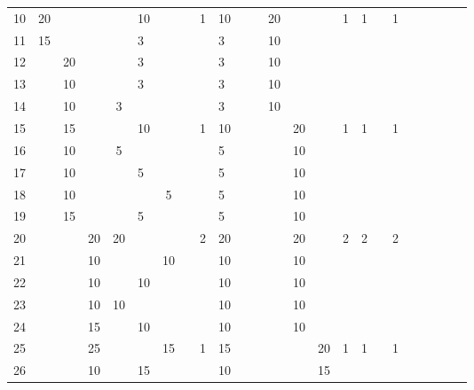 \begin{table}
\begin{tabular}{r|g c g c g c g c g c g c g c g c g c g c g c g}
  10 & 20 &    &    &    & 10 &    &    & 1 & 10 &    &    & 20 &    &    & 1 & 1 &    & 1 &   &   &   &   &   \\
  11 & 15 &    &    &    &  3 &    &    &   &  3 &    &    & 10 &    &    &   &   &    &   &   &   &   &   &   \\
  12 &    & 20 &    &    &  3 &    &    &   &  3 &    &    & 10 &    &    &   &   &    &   &   &   &   &   &   \\
  13 &    & 10 &    &    &  3 &    &    &   &  3 &    &    & 10 &    &    &   &   &    &   &   &   &   &   &   \\
  14 &    & 10 &    &  3 &    &    &    &   &  3 &    &    & 10 &    &    &   &   &    &   &   &   &   &   &   \\
  15 &    & 15 &    &    & 10 &    &    & 1 & 10 &    &    &    & 20 &    & 1 & 1 &    & 1 &   &   &   &   &   \\
  16 &    & 10 &    &  5 &    &    &    &   &  5 &    &    &    & 10 &    &   &   &    &   &   &   &   &   &   \\
  17 &    & 10 &    &    &  5 &    &    &   &  5 &    &    &    & 10 &    &   &   &    &   &   &   &   &   &   \\
  18 &    & 10 &    &    &    &  5 &    &   &  5 &    &    &    & 10 &    &   &   &    &   &   &   &   &   &   \\
  19 &    & 15 &    &    &  5 &    &    &   &  5 &    &    &    & 10 &    &   &   &    &   &   &   &   &   &   \\
  20 &    &    & 20 & 20 &    &    &    & 2 & 20 &    &    &    & 20 &    & 2 & 2 &    & 2 &   &   &   &   &   \\
  21 &    &    & 10 &    &    & 10 &    &   & 10 &    &    &    & 10 &    &   &   &    &   &   &   &   &   &   \\
  22 &    &    & 10 &    & 10 &    &    &   & 10 &    &    &    & 10 &    &   &   &    &   &   &   &   &   &   \\
  23 &    &    & 10 & 10 &    &    &    &   & 10 &    &    &    & 10 &    &   &   &    &   &   &   &   &   &   \\
  24 &    &    & 15 &    & 10 &    &    &   & 10 &    &    &    & 10 &    &   &   &    &   &   &   &   &   &   \\
  25 &    &    & 25 &    &    & 15 &    & 1 & 15 &    &    &    &    & 20 & 1 & 1 &    & 1 &   &   &   &   &   \\
  26 &    &    & 10 &    & 15 &    &    &   & 10 &    &    &    &    & 15 &   &   &    &   &   &   &   &   &   \\

\end{tabular}
\end{table}
